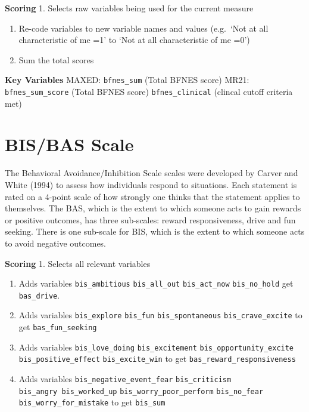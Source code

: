 \documentclass[
]{book}
\providecommand{\tightlist}{%
  \setlength{\itemsep}{0pt}\setlength{\parskip}{0pt}}
\begin{document}
\textbf{Scoring} 1. Selects raw variables being used for the current measure

\begin{enumerate}
\def\labelenumi{\arabic{enumi}.}
\setcounter{enumi}{1}
\item
  Re-code variables to new variable names and values (e.g.~`Not at all
  characteristic of me =1' to `Not at all characteristic of me =0')
\item
  Sum the total scores
\end{enumerate}

\textbf{Key Variables} MAXED: \texttt{bfnes\_sum} (Total BFNES score) MR21:
\texttt{bfnes\_sum\_score} (Total BFNES score) \texttt{bfnes\_clinical} (clincal cutoff
criteria met)

\section{BIS/BAS Scale}\label{bisbas-scale}

The Behavioral Avoidance/Inhibition Scale scales were developed by
Carver and White (1994) to assess how individuals respond to situations.
Each statement is rated on a 4-point scale of how strongly one thinks
that the statement applies to themselves. The BAS, which is the extent
to which someone acts to gain rewards or positive outcomes, has three
sub-scales: reward responsiveness, drive and fun seeking. There is one
sub-scale for BIS, which is the extent to which someone acts to avoid
negative outcomes.

\textbf{Scoring} 1. Selects all relevant variables

\begin{enumerate}
\def\labelenumi{\arabic{enumi}.}
\setcounter{enumi}{1}
\tightlist
\item
  Adds variables \texttt{bis\_ambitious} \texttt{bis\_all\_out} \texttt{bis\_act\_now}
  \texttt{bis\_no\_hold} get \texttt{bas\_drive}.
\item
  Adds variables \texttt{bis\_explore} \texttt{bis\_fun} \texttt{bis\_spontaneous}
  \texttt{bis\_crave\_excite} to get \texttt{bas\_fun\_seeking}
\item
  Adds variables \texttt{bis\_love\_doing} \texttt{bis\_excitement}
  \texttt{bis\_opportunity\_excite} \texttt{bis\_positive\_effect} \texttt{bis\_excite\_win} to
  get \texttt{bas\_reward\_responsiveness}
\item
  Adds variables \texttt{bis\_negative\_event\_fear} \texttt{bis\_criticism}
  \texttt{bis\_angry\ bis\_worked\_up} \texttt{bis\_worry\_poor\_perform} \texttt{bis\_no\_fear}
  \texttt{bis\_worry\_for\_mistake} to get \texttt{bis\_sum}
\end{enumerate}
\end{document}
